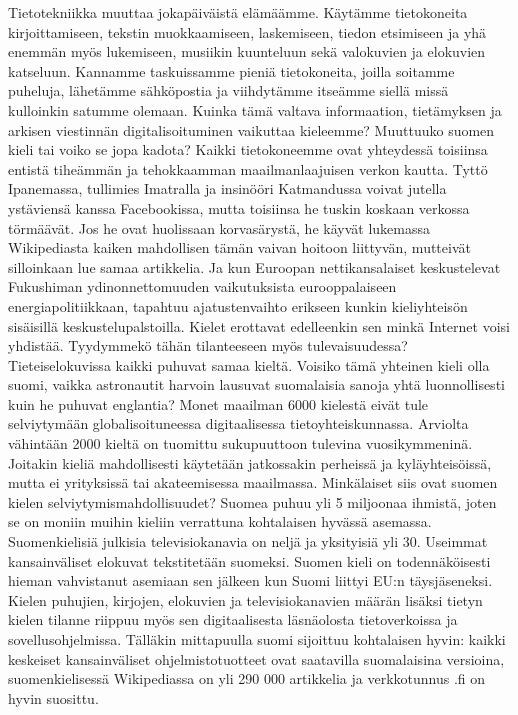\begin{multicols}{2}

Tietotekniikka muuttaa jokapäiväistä elämäämme. Käytämme tietokoneita kirjoittamiseen, tekstin muokkaamiseen, laskemiseen, tiedon etsimiseen ja yhä enemmän myös lukemiseen, musiikin kuunteluun sekä valokuvien ja elokuvien katseluun. Kannamme taskuissamme pieniä tietokoneita, joilla soitamme puheluja, lähetämme sähköpostia ja viihdytämme itseämme siellä missä kulloinkin satumme olemaan. Kuinka tämä valtava informaation, tietämyksen ja arkisen viestinnän digitalisoituminen vaikuttaa kieleemme? Muuttuuko suomen kieli tai voiko se jopa kadota?
Kaikki tietokoneemme ovat yhteydessä toisiinsa entistä tiheämmän ja tehokkaamman maailmanlaajuisen verkon kautta. Tyttö Ipanemassa, tullimies Imatralla ja insinööri Katmandussa voivat jutella ystäviensä kanssa Facebookissa, mutta toisiinsa he tuskin koskaan verkossa törmäävät. Jos he ovat huolissaan korvasärystä, he käyvät lukemassa Wikipediasta kaiken mahdollisen tämän vaivan hoitoon liittyvän, mutteivät silloinkaan lue samaa artikkelia. Ja kun Euroopan nettikansalaiset keskustelevat Fukushiman ydinonnettomuuden vaikutuksista eurooppalaiseen energiapolitiikkaan, tapahtuu ajatustenvaihto erikseen kunkin kieliyhteisön sisäisillä keskustelupalstoilla. Kielet erottavat edelleenkin sen minkä Internet voisi yhdistää. Tyydymmekö tähän tilanteeseen myös tulevaisuudessa?
Tieteiselokuvissa kaikki puhuvat samaa kieltä. Voisiko tämä yhteinen kieli olla suomi, vaikka astronautit harvoin lausuvat suomalaisia sanoja yhtä luonnollisesti kuin he puhuvat englantia? Monet maailman 6000 kielestä eivät tule selviytymään globalisoituneessa digitaalisessa tietoyhteiskunnassa. Arviolta vähintään 2000 kieltä on tuomittu sukupuuttoon tulevina vuosikymmeninä. Joitakin kieliä mahdollisesti käytetään jatkossakin perheissä ja kyläyhteisöissä, mutta ei yrityksissä tai akateemisessa maailmassa. Minkälaiset siis ovat suomen kielen selviytymismahdollisuudet?
Suomea puhuu yli 5 miljoonaa ihmistä, joten se on moniin muihin kieliin verrattuna kohtalaisen hyvässä asemassa. Suomenkielisiä julkisia televisiokanavia on neljä ja yksityisiä yli 30. Useimmat kansainväliset elokuvat tekstitetään suomeksi. Suomen kieli on todennäköisesti hieman vahvistanut asemiaan sen jälkeen kun Suomi liittyi EU:n täysjäseneksi.
Kielen puhujien, kirjojen, elokuvien ja televisiokanavien määrän lisäksi tietyn kielen tilanne riippuu myös sen digitaalisesta läsnäolosta tietoverkoissa ja sovellusohjelmissa. Tälläkin mittapuulla suomi sijoittuu kohtalaisen hyvin: kaikki keskeiset kansainväliset ohjelmistotuotteet ovat saatavilla suomalaisina versioina, suomenkielisessä Wikipediassa on yli 290 000 artikkelia ja verkkotunnus .fi on hyvin suosittu.

\end{multicols}
